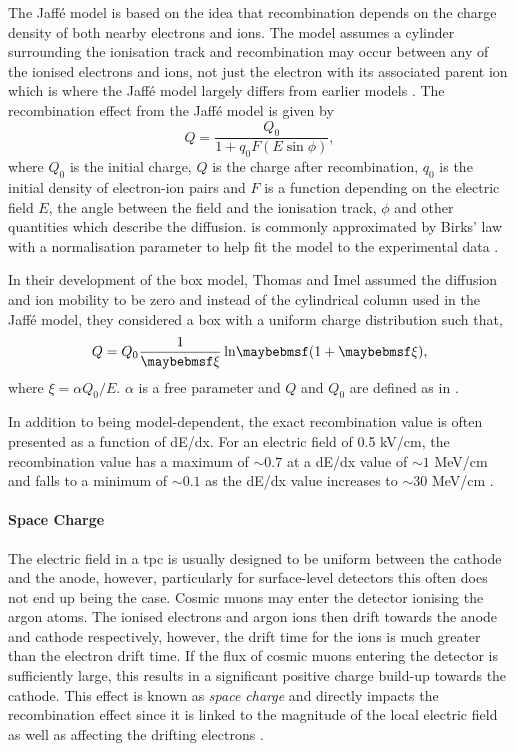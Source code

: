 The Jaff\'{e} model is based on the idea that recombination depends on the charge density of both nearby electrons and ions. The model assumes a cylinder surrounding the ionisation track and recombination may occur between any of the ionised electrons and ions, not just the electron with its associated parent ion which is where the Jaff\'{e} model largely differs from earlier models \cite{Jaffe_model}. The recombination effect from the Jaff\'{e} model is given by 
\begin{equation}\label{Jaffe}
    Q = \frac{Q_{0}}{1+q_{0}F(E\sin{\phi})},
\end{equation}
where $Q_0$ is the initial charge, $Q$ is the charge after recombination, $q_0$ is the initial density of electron-ion pairs and $F$ is a function depending on the electric field $E$, the angle between the field and the ionisation track, $\phi$ and other quantities which describe the diffusion.  is commonly approximated by Birks' law with a normalisation parameter to help fit the model to the experimental data \cite{LArTPC_book}. 

In their development of the box model, Thomas and Imel assumed the diffusion and ion mobility to be zero and instead of the cylindrical column used in the Jaff\'{e} model, they considered a box with a uniform charge distribution such that, 
\begin{equation}
    Q = Q_{0}\frac{1}{\xi}\lnOfbraces{1+\xi},
\end{equation}
where $\xi = \alpha Q_0/E$. $\alpha$ is a free parameter and $Q$ and $Q_0$ are defined as in \cite{LArTPC_book}\cite{Recombination_box_model}.

In addition to being model-dependent, the exact recombination value is often presented as a function of dE/dx. For an electric field of 0.5 kV/cm, the recombination value has a maximum of $\sim0.7$ at a dE/dx value of $\sim1$ MeV/cm and falls to a minimum of $\sim0.1$ as the dE/dx value increases to $\sim30$ MeV/cm \cite{LArTPC_book}.

\paragraph{Space Charge}
The electric field in a \gls{tpc} is usually designed to be uniform between the cathode and the anode, however, particularly for surface-level detectors this often does not end up being the case. Cosmic muons may enter the detector ionising the argon atoms. The ionised electrons and argon ions then drift towards the anode and cathode respectively, however, the drift time for the ions is much greater than the electron drift time. If the flux of cosmic muons entering the detector is sufficiently large, this results in a significant positive charge build-up towards the cathode. This effect is known as \textit{space charge} and directly impacts the recombination effect since it is linked to the magnitude of the local electric field as well as affecting the drifting electrons \cite{microboone_sce}.

